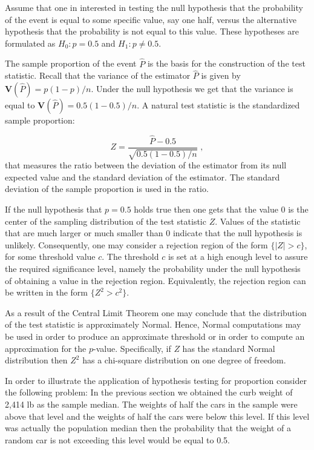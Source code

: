 \documentclass[]{krantz}
\newcommand{\Var}{\mathbf{V}}
\theoremstyle{definition}
\theoremstyle{definition}
\theoremstyle{definition}
\theoremstyle{remark}
\begin{document}
Assume that one in interested in testing the null hypothesis that the
probability of the event is equal to some specific value, say one half,
versus the alternative hypothesis that the probability is not equal to
this value. These hypotheses are formulated as \(H_0:p = 0.5\) and
\(H_1:p\not = 0.5\).

The sample proportion of the event \(\hat P\) is the basis for the
construction of the test statistic. Recall that the variance of the
estimator \(\hat P\) is given by \(\Var(\hat P) = p(1-p)/n\). Under the null
hypothesis we get that the variance is equal to
\(\Var(\hat P) = 0.5(1-0.5)/n\). A natural test statistic is the
standardized sample proportion:

\[Z = \frac{\hat P - 0.5}{\sqrt{0.5 (1-0.5)/n}}\;,\] that measures the
ratio between the deviation of the estimator from its null expected
value and the standard deviation of the estimator. The standard
deviation of the sample proportion is used in the ratio.

If the null hypothesis that \(p=0.5\) holds true then one gets that the
value 0 is the center of the sampling distribution of the test statistic
\(Z\). Values of the statistic that are much larger or much smaller than 0
indicate that the null hypothesis is unlikely. Consequently, one may
consider a rejection region of the form \(\{|Z| > c\}\), for some
threshold value \(c\). The threshold \(c\) is set at a high enough level to
assure the required significance level, namely the probability under the
null hypothesis of obtaining a value in the rejection region.
Equivalently, the rejection region can be written in the form
\(\{Z^2 > c^2\}\).

As a result of the Central Limit Theorem one may conclude that the
distribution of the test statistic is approximately Normal. Hence,
Normal computations may be used in order to produce an approximate
threshold or in order to compute an approximation for the \(p\)-value.
Specifically, if \(Z\) has the standard Normal distribution then \(Z^2\) has
a chi-square distribution on one degree of freedom.

In order to illustrate the application of hypothesis testing for
proportion consider the following problem: In the previous section we
obtained the curb weight of 2,414 lb as the sample median. The weights
of half the cars in the sample were above that level and the weights of
half the cars were below this level. If this level was actually the
population median then the probability that the weight of a random car
is not exceeding this level would be equal to 0.5.
\end{document}
